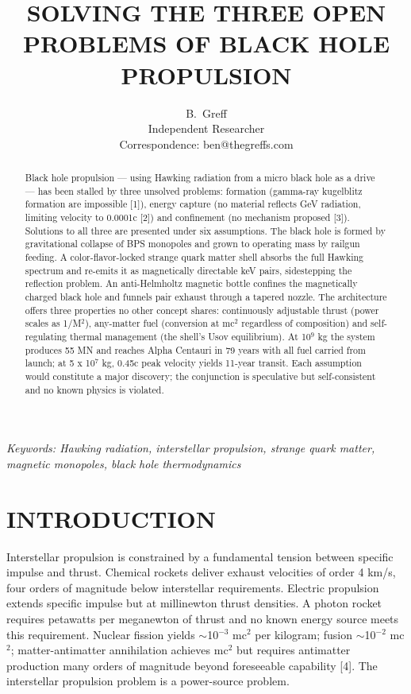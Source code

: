 \documentclass[12pt,a4paper]{article}
\title{\textbf{SOLVING THE THREE OPEN PROBLEMS OF BLACK HOLE PROPULSION}}
\author{B.\ Greff \\ Independent Researcher \\ Correspondence: ben@thegreffs.com}
\date{}
\begin{document}
\maketitle
\thispagestyle{empty}

\begin{abstract}
\noindent Black hole propulsion --- using Hawking radiation from a micro black hole as a drive --- has been stalled by three unsolved problems: formation (gamma-ray kugelblitz formation are impossible [1]), energy capture (no material reflects GeV radiation, limiting velocity to 0.0001c [2]) and confinement (no mechanism proposed [3]). Solutions to all three are presented under six assumptions. The black hole is formed by gravitational collapse of BPS monopoles and grown to operating mass by railgun feeding. A color-flavor-locked strange quark matter shell absorbs the full Hawking spectrum and re-emits it as magnetically directable keV pairs, sidestepping the reflection problem. An anti-Helmholtz magnetic bottle confines the magnetically charged black hole and funnels pair exhaust through a tapered nozzle. The architecture offers three properties no other concept shares: continuously adjustable thrust (power scales as 1/M$^{2}$), any-matter fuel (conversion at mc$^{2}$ regardless of composition) and self-regulating thermal management (the shell's Usov equilibrium). At 10$^{9}$ kg the system produces 55 MN and reaches Alpha Centauri in 79 years with all fuel carried from launch; at 5 x 10$^{7}$ kg, 0.45c peak velocity yields 11-year transit. Each assumption would constitute a major discovery; the conjunction is speculative but self-consistent and no known physics is violated.
\end{abstract}
\noindent \textit{Keywords: Hawking radiation, interstellar propulsion, strange quark matter, magnetic monopoles, black hole thermodynamics}
\bigskip
\section{INTRODUCTION}
Interstellar propulsion is constrained by a fundamental tension between specific impulse and thrust. Chemical rockets deliver exhaust velocities of order 4 km/s, four orders of magnitude below interstellar requirements. Electric propulsion extends specific impulse but at millinewton thrust densities. A photon rocket requires petawatts per meganewton of thrust and no known energy source meets this requirement. Nuclear fission yields $\sim$10$^{-3}$ mc$^{2}$ per kilogram; fusion $\sim$10$^{-2}$ mc$^{2}$; matter-antimatter annihilation achieves mc$^{2}$ but requires antimatter production many orders of magnitude beyond foreseeable capability [4]. The interstellar propulsion problem is a power-source problem.
\end{document}
